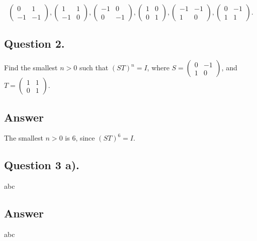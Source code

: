 \[
    \begin{pmatrix}
        0 & 1\\
        -1 & -1
    \end{pmatrix},
    \begin{pmatrix}
        1 & 1\\
        -1 & 0
    \end{pmatrix},
    \begin{pmatrix}
        -1 & 0\\
        0 & -1
    \end{pmatrix},
    \begin{pmatrix}
        1 & 0\\
        0 & 1
    \end{pmatrix},
    \begin{pmatrix}
        -1 & -1\\
        1 & 0
    \end{pmatrix},
    \begin{pmatrix}
        0 & -1\\
        1 & 1
    \end{pmatrix}.
\]


\subsection{Question 2.}
\noindent
Find the smallest $n>0$ such that $(ST)^n = I$, where
$S = \begin{pmatrix}
         0 & -1\\
          1 & 0 \end{pmatrix}$, and
$T = \begin{pmatrix}
         1 & 1\\
         0 & 1 \end{pmatrix}$.

\subsection*{Answer}
\noindent
The smallest $n>0$ is $6$, since $(ST)^6 = I$.


\subsection{Question 3 a).}
\noindent
abc

\subsection*{Answer}
\noindent
abc
